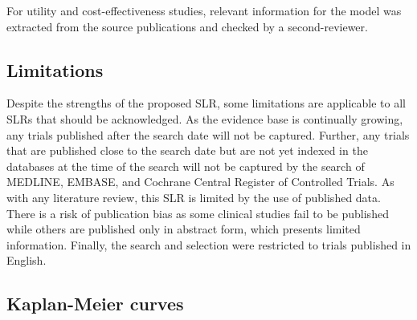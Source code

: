 \documentclass[11pt,final,fleqn]{article}\usepackage[]{graphicx}\usepackage[]{color}
\theoremstyle{plain}
\begin{document}
{\begin{appendices}
For utility and cost-effectiveness studies, relevant information for the model was extracted from the source publications and checked by a second-reviewer. 

\subsection{Limitations}
Despite the strengths of the proposed SLR, some limitations are applicable to all SLRs that should be acknowledged. As the evidence base is continually growing, any trials published after the search date will not be captured. Further, any trials that are published close to the search date but are not yet indexed in the databases at the time of the search will not be captured by the search of MEDLINE, EMBASE, and Cochrane Central Register of Controlled Trials. As with any literature review, this SLR is limited by the use of published data. There is a risk of publication bias as some clinical studies fail to be published while others are published only in abstract form, which presents limited information. Finally, the search and selection were restricted to trials published in English.


\subsection{Kaplan-Meier curves}
 \iffalse


\end{appendices}}
\end{document}
